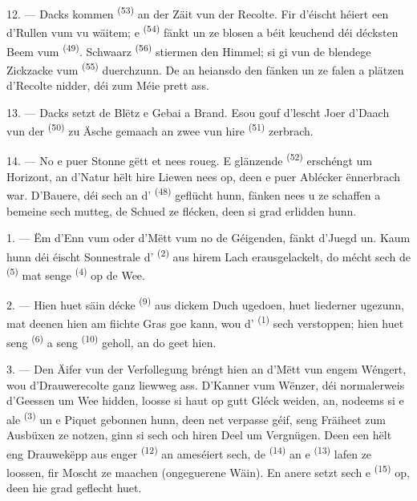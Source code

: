 \VUsaut{5.0mm}
\VUsaut{3.4mm}

12. --- Dacks kommen  \textsuperscript{(53)} an der Zäit vun der
Recolte. Fir d'éischt héiert een d'Rullen vum  vu wäitem; e
 \textsuperscript{(54)} fänkt un ze blosen a béit keuchend déi
décksten Beem vum  \textsuperscript{(49)}. Schwaarz
 \textsuperscript{(56)} stiermen den Himmel; si gi vun de
blendege Zickzacke vum  \textsuperscript{(55)} duerchzunn. De
 an heiansdo den  fänken un ze falen a plätzen d'Recolte
nidder, déi zum Méie prett ass.

13. --- Dacks setzt de Blëtz e Gebai a Brand. Esou gouf d'lescht Joer d'Daach vun
der  \textsuperscript{(50)} zu Äsche gemaach an zwee vun hire
 \textsuperscript{(51)} zerbrach.

14. --- No e puer Stonne gëtt et nees roueg. E glänzende 
\textsuperscript{(52)} erschéngt um Horizont, an d'Natur hëlt hire Liewen nees op, deen
e puer Ablécker ënnerbrach war. D'Bauere, déi sech an d'
\textsuperscript{(48)} geflücht hunn, fänken nees u ze schaffen a bemeine sech mutteg,
de Schued ze flécken, deen si grad erlidden hunn.

\VUsaut{6.0mm}
\VUsaut{3.6mm}

\VUsaut{1.4mm}
\VUsaut{4.0mm}

1. --- Ëm d'Enn vum  oder d'Mëtt vum  no de
Géigenden, fänkt d'Juegd un. Kaum hunn déi éischt Sonnestrale d'
\textsuperscript{(2)} aus hirem Lach erausgelackelt, do mécht sech de
 \textsuperscript{(5)} mat senge  \textsuperscript{(4)} op
de Wee.

2. --- Hien huet säin décke  \textsuperscript{(9)} aus dickem
Duch ugedoen, huet liederner  ugezunn, mat deenen hien am fiichte
Gras goe kann, wou d' \textsuperscript{(1)} sech verstoppen; hien
huet seng  \textsuperscript{(6)} a seng 
\textsuperscript{(10)} geholl, an do geet hien.

3. --- Den Äifer vun der Verfollegung bréngt hien an d'Mëtt vun engem Wéngert, wou
d'Drauwerecolte ganz liewweg ass. D'Kanner vum Wënzer, déi normalerweis d'Geessen um
Wee hidden, loosse si haut op gutt Gléck weiden, an, nodeems si e ale
 \textsuperscript{(3)} un e Piquet gebonnen hunn, deen net verpasse
géif, seng Fräiheet zum Ausbüxen ze notzen, ginn si sech och hiren Deel um
Vergnügen. Deen een hëlt eng Drauwekëpp aus enger 
\textsuperscript{(12)} an ameséiert sech, de  \textsuperscript{(14)} an
e  \textsuperscript{(13)} lafen ze loossen, fir Moscht ze maachen
(ongeguerene Wäin). En anere setzt sech e 
\textsuperscript{(15)} op, deen hie grad geflecht huet.

